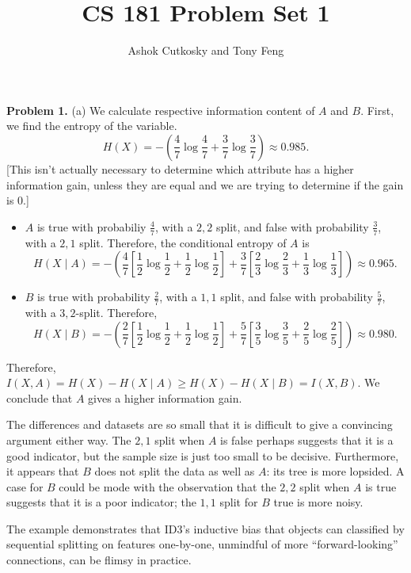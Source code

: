\documentclass[12pt]{amsart}
\title{CS 181 Problem Set 1}
\author{Ashok Cutkosky and Tony Feng}
\theoremstyle{remark}
\begin{document}
\maketitle

\noindent \textbf{Problem 1.} (a) We calculate respective information content of $A$ and $B$. First, we find the entropy of the variable. 
\[
H(X) = -\left( \frac{4}{7} \log \frac{4}{7} + \frac{3}{7} \log \frac{3}{7} \right) \approx 0.985. 
\]
[This isn't actually necessary to determine which attribute has a higher information gain, unless they are equal and we are trying to determine if the gain is $0$.] 
\begin{itemize}
\item $A$ is true with probabiliy $\frac{4}{7}$, with a $2,2$ split, and false with probability $\frac{3}{7}$, with a $2,1$ split. Therefore, the conditional entropy of $A$ is 
\[
H(X \mid A) = - \left( \frac{4}{7} \left[ \frac{1}{2} \log \frac{1}{2} + \frac{1}{2} \log \frac{1}{2} \right] + 
\frac{3}{7} \left[ \frac{2}{3} \log \frac{2}{3} + \frac{1}{3} \log \frac{1}{3} \right] \right) \approx 0.965. 
\]
\item $B$ is true with probability $\frac{2}{7}$, with a $1,1$ split, and false with probability $\frac{5}{7}$, with a $3,2$-split. Therefore, 
\[
H(X \mid B) = - \left( \frac{2}{7} \left[ \frac{1}{2} \log \frac{1}{2} + \frac{1}{2} \log \frac{1}{2} \right]  + \frac{5}{7} \left[ \frac{3}{5} \log \frac{3}{5} + \frac{2}{5} \log \frac{2}{5} \right] \right) \approx 0.980.
\]
\end{itemize} 
Therefore, $I(X,A) = H(X) - H(X \mid A) \geq H(X) - H(X \mid B) = I(X,B)$. We conclude that $A$ gives a higher information gain. 

The differences and datasets are so small that it is difficult to give a convincing argument either way. The 
$2,1$ split when $A$ is false perhaps suggests that it is a good indicator, but the sample size is just too 
small to be decisive. Furthermore, it appears that $B$ does not split the data as well as $A$: its tree is more 
lopsided. A case for $B$ could be mode with the observation that the $2,2$ split when $A$ is true suggests 
that it is a poor indicator; the $1,1$ split for $B$ true is more noisy. 

The example demonstrates that ID3's inductive bias that objects can classified by sequential splitting on features one-by-one, unmindful of more ``forward-looking'' connections, can be flimsy in practice. \\
\end{document}
